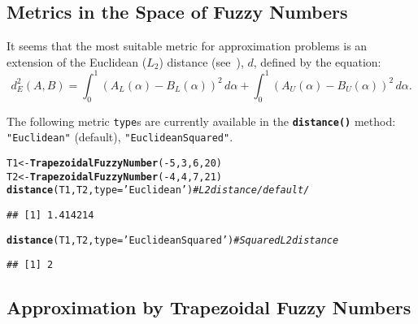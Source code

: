 \documentclass[11pt]{article}\usepackage[]{graphicx}\usepackage[]{color}
\makeatletter
\newcommand{\hlnum}[1]{\textcolor[rgb]{0.686,0.059,0.569}{#1}}%
\newcommand{\hlstr}[1]{\textcolor[rgb]{0.192,0.494,0.8}{#1}}%
\newcommand{\hlcom}[1]{\textcolor[rgb]{0.678,0.584,0.686}{\textit{#1}}}%
\newcommand{\hlopt}[1]{\textcolor[rgb]{0,0,0}{#1}}%
\newcommand{\hlstd}[1]{\textcolor[rgb]{0.345,0.345,0.345}{#1}}%
\newcommand{\hlkwb}[1]{\textcolor[rgb]{0.69,0.353,0.396}{#1}}%
\newcommand{\hlkwc}[1]{\textcolor[rgb]{0.333,0.667,0.333}{#1}}%
\newcommand{\hlkwd}[1]{\textcolor[rgb]{0.737,0.353,0.396}{\textbf{#1}}}%
\newenvironment{kframe}{%
 \def\at@end@of@kframe{}%
 \ifinner\ifhmode%
  \def\at@end@of@kframe{\end{minipage}}%
  \begin{minipage}{\columnwidth}%
 \fi\fi%
 \def\FrameCommand##1{\hskip\@totalleftmargin \hskip-\fboxsep
 \colorbox{shadecolor}{##1}\hskip-\fboxsep
     \hskip-\linewidth \hskip-\@totalleftmargin \hskip\columnwidth}%
 \MakeFramed {\advance\hsize-\width
   \@totalleftmargin\z@ \linewidth\hsize
   \@setminipage}}%
 {\par\unskip\endMakeFramed%
 \at@end@of@kframe}
\newenvironment{knitrout}{}{} %
\newcommand{\func}[1]{\texttt{\hlkwd{#1}}}
\newcommand{\argument}[1]{\texttt{\hlkwc{#1}}}
\newcommand{\str}[1]{\texttt{\hlstr{#1}}}
\makeatother
\begin{document}
\subsection{Metrics in the Space of Fuzzy Numbers}

It seems that the most suitable metric for approximation problems
is an extension of the Euclidean ($L_2$) distance
(see~\cite{Grzegorzewski1998:metricsordersfn}), $d$, defined by the equation:
\begin{equation}
d_E^2(A,B) = \int_0^1 \left(A_L(\alpha)-B_L(\alpha)\right)^2\,d\alpha
         + \int_0^1 \left(A_U(\alpha)-B_U(\alpha)\right)^2\,d\alpha.
\end{equation}


The following metric \argument{type}s are currently
available in the \func{distance()} method: \str{"{}Euclidean"{}} (default),
\str{"{}EuclideanSquared"{}}.

\begin{knitrout}\small
{}\color{fgcolor}\begin{kframe}
\begin{alltt}
\hlstd{T1} \hlkwb{<-} \hlkwd{TrapezoidalFuzzyNumber}\hlstd{(}\hlopt{-}\hlnum{5}\hlstd{,} \hlnum{3}\hlstd{,} \hlnum{6}\hlstd{,} \hlnum{20}\hlstd{)}
\hlstd{T2} \hlkwb{<-} \hlkwd{TrapezoidalFuzzyNumber}\hlstd{(}\hlopt{-}\hlnum{4}\hlstd{,} \hlnum{4}\hlstd{,} \hlnum{7}\hlstd{,} \hlnum{21}\hlstd{)}
\hlkwd{distance}\hlstd{(T1, T2,} \hlkwc{type}\hlstd{=}\hlstr{'Euclidean'}\hlstd{)} \hlcom{# L2 distance /default/}
\end{alltt}
\begin{verbatim}
## [1] 1.414214
\end{verbatim}
\begin{alltt}
\hlkwd{distance}\hlstd{(T1, T2,} \hlkwc{type}\hlstd{=}\hlstr{'EuclideanSquared'}\hlstd{)} \hlcom{# Squared L2 distance}
\end{alltt}
\begin{verbatim}
## [1] 2
\end{verbatim}
\end{kframe}
\end{knitrout}







\subsection{Approximation by Trapezoidal Fuzzy Numbers}
\end{document}
